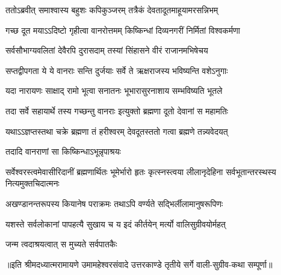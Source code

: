 \twolineshloka
{ततोऽब्रवीत् समाश्वास्य बहुशः कपिकुञ्जरम्}
{तत्रैकं देवतादूतमाहूयामरसन्निभम्} %

\twolineshloka
{गच्छ दूत मयाऽऽदिष्टो गृहीत्वा वानरोत्तमम्}
{किष्किन्धां दिव्यनगरीं निर्मितां विश्वकर्मणा} %

\twolineshloka
{सर्वसौभाग्यवलितां देवैरपि दुरासदाम्}
{तस्यां सिंहासने वीरं राजानमभिषेचय} %

\twolineshloka
{सप्तद्वीपगता ये ये वानराः सन्ति दुर्जयाः}
{सर्वे ते ऋक्षराजस्य भविष्यन्ति वशेऽनुगाः} %

\twolineshloka
{यदा नारायणः साक्षाद् रामो भूत्वा सनातनः}
{भूभारासुरनाशाय सम्भविष्यति भूतले} %

\twolineshloka
{तदा सर्वे सहायार्थे तस्य गच्छन्तु वानराः}
{इत्युक्तो ब्रह्मणा दूतो देवानां स महामतिः} %

\twolineshloka
{यथाऽऽज्ञप्तस्तथा चक्रे ब्रह्मणा तं हरीश्वरम्}
{देवदूतस्ततो गत्वा ब्रह्मणे तन्न्यवेदयत्} %

\onelineshloka
{तदादि वानराणां सा किष्किन्धाऽभून्नृपाश्रयः} %

\threelineshloka
{सर्वेश्वरस्त्वमेवासीरिदानीं ब्रह्मणार्थितः}
{भूमेर्भारो हृतः कृत्स्नस्त्वया लीलानृदेहिना}
{सर्वभूतान्तरस्थस्य नित्यमुक्तचिदात्मनः} %

\twolineshloka
{अखण्डानन्तरूपस्य कियानेष पराक्रमः}
{तथाऽपि वर्ण्यते सद्भिर्लीलामानुषरूपिणः} %

\twolineshloka
{यशस्ते सर्वलोकानां पापहत्यै सुखाय च}
{य इदं कीर्तयेन् मर्त्यो वालिसुग्रीवयोर्महत्} %

\onelineshloka
{जन्म त्वदाश्रयत्वात् स मुच्यते सर्वपातकैः} %

{॥इति श्रीमदध्यात्मरामायणे उमामहेश्वरसंवादे उत्तरकाण्डे तृतीये  सर्गे
वाली-सुग्रीव-कथा सम्पूर्णा॥}
